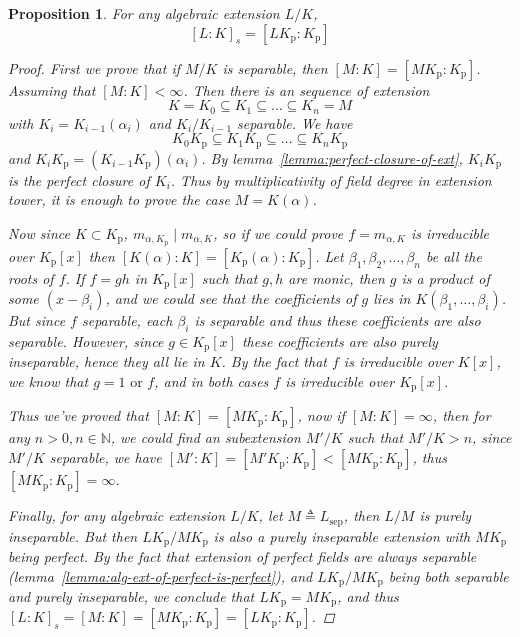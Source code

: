 \documentclass[a4paper]{article}
\newcommand{\defeq}{\triangleq}
\newcommand{\Nb}{\mathbb{N}}
\theoremstyle{mystyle}
\newtheorem{proposition}{Proposition}
\theoremstyle{remark}
\theoremstyle{definition}
\theoremstyle{definition}
\begin{document}
  \newcommand*{\Kp}{K_\mathrm{p}}
  \newcommand*{\Ks}{K_\mathrm{s}}
  \begin{proposition} \label{prop:separable-deg-equal-perfect-closure-deg}
    For any algebraic extension $L/K$,
    \[ [L: K]_s = [LK_\mathrm{p}: K_\mathrm{p}] \]

    \begin{proof}
      First we prove that if $M/K$ is separable, then $[M: K] = [MK_\mathrm{p}: K_\mathrm{p}]$.
      Assuming that $[M: K] < \infty$. Then there is an sequence of extension
      \[ K = K_0 \subseteq K_1 \subseteq \dots \subseteq K_n = M \]
      with $K_i = K_{i-1}(\alpha_i)$ and $K_i / K_{i-1}$ separable. We have
      \[ K_0 \Kp \subseteq K_1 \Kp \subseteq \dots \subseteq K_n \Kp \]
      and $K_i \Kp = (K_{i-1} \Kp)(\alpha_i)$. By lemma~\ref{lemma:perfect-closure-of-ext},
      $K_i \Kp$ is the perfect closure of $K_i$. Thus by multiplicativity of field degree
      in extension tower, it is enough to prove the case $M = K(\alpha)$.

      Now since $K \subset \Kp$, $m_{\alpha, \Kp} \mid m_{\alpha, K}$, so if we could
      prove $f = m_{\alpha, K}$ is irreducible over $\Kp[x]$ then $[K(\alpha): K] = [\Kp(\alpha): \Kp]$.
      Let $\beta_1, \beta_2, \dots, \beta_n$ be all the roots of $f$. If $f = gh$ in $\Kp[x]$
      such that $g, h$ are monic, then $g$ is a product of some $(x - \beta_i)$, and
      we could see that the coefficients of $g$ lies in $K(\beta_1, \dots, \beta_i)$.
      But since $f$ separable, each $\beta_i$ is separable and thus these coefficients are
      also separable. However, since $g \in \Kp[x]$ these coefficients are also purely inseparable,
      hence they all lie in $K$. By the fact that $f$ is irreducible over $K[x]$, we know
      that $g = 1 \text{ or } f$, and in both cases $f$ is irreducible over $\Kp[x]$.

      Thus we've proved that $[M: K] = [M \Kp: \Kp]$, now if $[M: K] = \infty$, then
      for any $n > 0, n \in \Nb$, we could find an subextension $M'/K$ such that $M'/K > n$,
      since $M'/K$ separable, we have $[M': K] = [M' \Kp: \Kp] < [M \Kp: \Kp]$, thus $[M \Kp: \Kp] = \infty$.

      Finally, for any algebraic extension $L/K$, let $M \defeq L_\text{sep}$, then $L / M$
      is purely inseparable. But then $L \Kp / M \Kp$ is also a purely inseparable extension
      with $M \Kp$ being perfect. By the fact that extension of perfect fields are always separable
      (lemma~\ref{lemma:alg-ext-of-perfect-is-perfect}),
      and $L \Kp / M \Kp$ being both separable and purely inseparable,
      we conclude that $L \Kp = M \Kp$, and thus $[L: K]_s = [M: K] = [M \Kp : \Kp] = [L \Kp: \Kp]$.
    \end{proof}
  \end{proposition}
\end{document}
